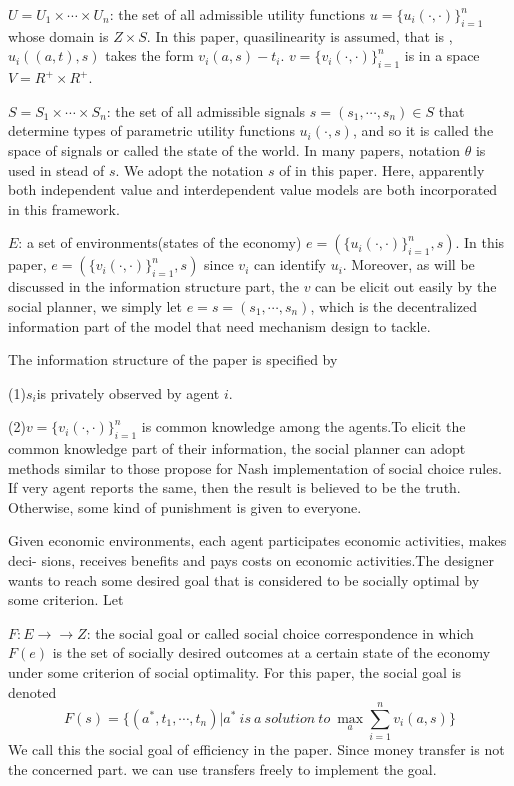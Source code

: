 $U=U_1\times \cdots\times U_n$: the set of all admissible utility functions  $u = \{u_i(\cdot, \cdot)\}_{i=1}^n$ whose 
domain is $Z\times S$. In this paper, quasilinearity is assumed, that is , $u_i((a,t), s)$ takes the form $v_i(a,s)-t_i$. 
$v=\{v_i(\cdot, \cdot)\}_{i=1}^n$ is in a space $V=R^+\times R^+$.

$S=S_1\times \cdots\times S_n$: the set of all admissible signals $s=(s_1,\cdots,s_n)\in S$ that determine types of 
parametric utility functions $u_i(\cdot, s)$, and so it is called the space of signals or called the state of the world. 
In many papers, notation $\theta$ is used in stead of $s$. We adopt the notation $s$ of \parencite{Maskin00} in this paper.
Here, apparently both independent value and interdependent value models are both incorporated in this framework.

$E$: a set of  environments(states of the economy) $e=(\{u_i(\cdot, \cdot)\}_{i=1}^n,s)$. In this paper, 
$e=(\{v_i(\cdot, \cdot)\}_{i=1}^n,s)$ since $v_i$ can identify $u_i$. Moreover,
as will be discussed in the information structure part, the $v$ can be elicit out easily by the social
planner, we simply let $e=s=(s_1,\cdots,s_n)$, which is the decentralized information part of the model that need 
mechanism design to tackle.

The information structure of the paper is specified by

(1)$s_i$is privately observed by agent $i$.

(2)$v=\{v_i(\cdot, \cdot)\}_{i=1}^n$ is common knowledge among the agents.To elicit the common
knowledge part of their information, the social planner can adopt methods similar to those \parencite{Repullo90} propose for Nash
implementation of social choice rules. If very agent reports the same, then the result is believed to be the truth. Otherwise,
some kind of punishment is given to everyone.  

Given economic environments, each agent participates economic activities, makes deci-
sions, receives benefits and pays costs on economic activities.The designer wants to reach
some desired goal that is considered to be socially optimal by some criterion. Let

$F:E\rightarrow \rightarrow Z$: the social goal or called social choice correspondence in which
$F(e)$ is the set of socially desired outcomes at a certain state of the economy under some
criterion of social optimality. For this paper, the social goal is denoted
$$F(s)=\{(a^*,t_1,\cdots,t_n)|a^*\ is\ a \ solution\ to \ \max_a \sum_{i=1}^n v_i(a,s)\}$$
We call this the social goal of efficiency in the paper. Since money transfer is not the concerned part.  we can use 
transfers freely to implement the goal.




